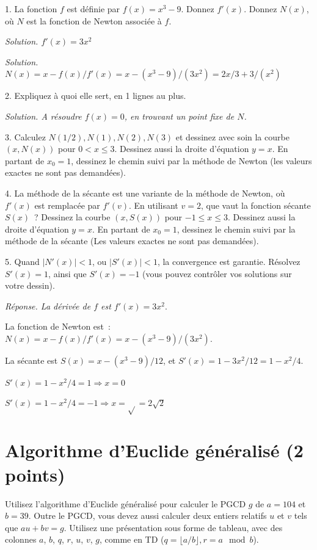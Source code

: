 \documentclass[11pt]{article}
\begin{document}
1. La fonction $f$ est définie par $f(x)=x^3-9$. Donnez $f'(x)$.
Donnez  $N(x)$, où $N$ est la fonction de Newton associée à $f$.
 
\ifcorrige
{\it Solution. $f'(x)=3x^2$ }
\else\fi

\ifcorrige
{\it Solution. $N(x)=x - f(x)/f'(x)= x - (x^3-9)/(3x^2)=2x/3 + 3/(x^2)$
}
\else\fi


2. Expliquez à quoi elle sert, en 1 lignes au plus.
 
\ifcorrige
{\it Solution. A résoudre $f(x)=0$, en trouvant un point fixe de $N$.
}
\else\fi

 


3.  Calculez $N(1/2), N(1), N(2), N(3)$ et dessinez   avec soin la courbe $(x, N(x))$ pour $0 < x \le 3$.
Dessinez aussi la droite d'équation $y=x$.
En partant de $x_0=1$, dessinez 
le chemin suivi par la méthode de Newton (les valeurs exactes ne sont pas demandées).
 
4. La méthode de la sécante est une variante de la méthode de Newton, où
$f'(x)$ est remplacée par $f'(v)$. En utilisant $v=2$, 
que vaut la fonction sécante $S(x)$~? 
Dessinez  la courbe $(x, S(x))$ pour $-1 \le x \le 3$.
Dessinez  aussi la droite d'équation $y=x$.
En partant de $x_0=1$, dessinez
le chemin suivi par la méthode de la sécante
(Les valeurs exactes ne sont pas demandées).
 
5. Quand $|N'(x)|< 1$, ou $|S'(x)| < 1$, la convergence est garantie. Résolvez
$S'(x)=1$, ainsi que $S'(x)= -1$ (vous pouvez  contrôler vos solutions sur votre dessin). 


\ifcorrige
{\it Réponse. La dérivée de $f$ est $f'(x)=3x^2.$

La fonction de Newton est~: $N(x)= x - f(x)/f'(x) = x - (x^3-9)/(3x^2)$.

La sécante est $S(x)= x - (x^3-9)/12$, et $S'(x)=1-3x^2/12=1-x^2/4$.

$S'(x)=1-x^2/4=1 \Rightarrow x=0$

$S'(x)=1-x^2/4=-1  \Rightarrow x =\sqrt{}=2\sqrt{2}$

}
\else
\fi

{
\section{Algorithme d'Euclide généralisé (2 points)}
Utilisez  l'algorithme d'Euclide généralisé
pour calculer le PGCD $g$ de $a=104$ et $b=39$. Outre le PGCD, vous devez
aussi calculer deux entiers relatifs $u$ et $v$ tels que $a u + b v=g$.
Utilisez une présentation sous forme de tableau, avec des colonnes $a$, $b$, $q$, $r$, $u$, $v$, $g$, comme en TD ($q=\lfloor a/b\rfloor, r=a \mod b$).
}
\end{document}

